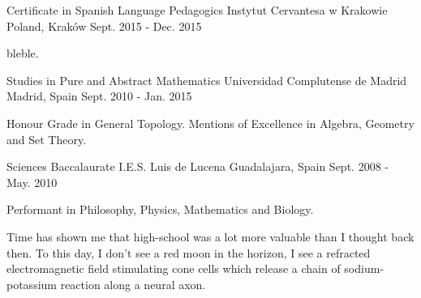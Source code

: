

\begin{cventries}

  \cventry
    {Certificate in Spanish Language Pedagogics} %
    {Instytut Cervantesa w Krakowie} %
    {Poland, Kraków} %
    {Sept. 2015 - Dec. 2015} %
    {
      \begin{cvitems} %
        \item {bleble.} %
      \end{cvitems}
    }

\cventry
	{Studies in Pure and Abstract Mathematics} %
	{Universidad Complutense de Madrid} %
	{Madrid, Spain} %
	{Sept. 2010 - Jan. 2015} %
	{
		\begin{cvitems} %
			\item {Honour Grade in General Topology. Mentions of Excellence in Algebra, Geometry and Set Theory.}
			\item {} %
		\end{cvitems}
	}

\cventry
	{Sciences Baccalaurate} %
	{I.E.S. Luis de Lucena} %
	{Guadalajara, Spain} %
	{Sept. 2008 - May. 2010} %
	{
		\begin{cvitems} %
			\item {Performant in Philosophy, Physics, Mathematics and Biology.}
			\item {Time has shown me that high-school was a lot more valuable than I thought back then. To this day, I don't see a red moon in the horizon, I see a refracted electromagnetic field stimulating cone cells which release a chain of sodium-potassium reaction along a neural axon.}
		\end{cvitems}
	}

\end{cventries}
